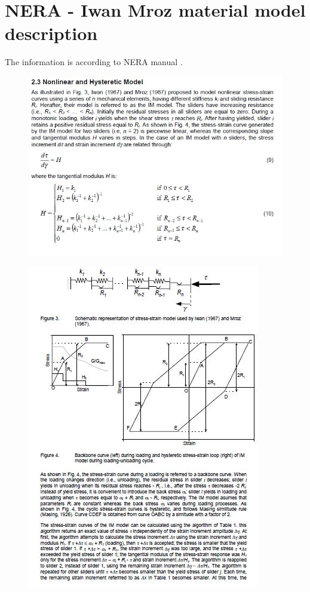 \documentclass[11pt,a4paper]{report}
\begin{document}
\chapter{NERA - Iwan Mroz material model description} \label{NERAa}
The information is according to NERA manual \cite{NERA}.
\begin{figure}[h!]
	\centering
	\includegraphics[width=1\linewidth]{"NERA1"}
	\label{Nera1}
\end{figure}

\begin{figure}[h!]
	\centering
	\includegraphics[width=1\linewidth]{"NERA2"}
	\label{Nera2}
\end{figure}
\end{document}
